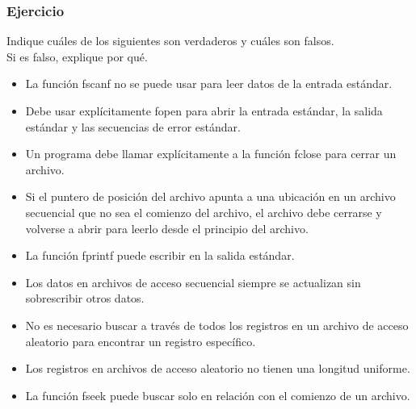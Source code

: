 \subsubsection{Ejercicio}
Indique cuáles de los siguientes son verdaderos y cuáles son falsos.\\
Si es falso, explique por qué.
\begin{itemize}[a)]
  \item La función fscanf no se puede usar para leer datos de la entrada estándar.
  \item Debe usar explícitamente fopen para abrir la entrada estándar, la salida estándar y las secuencias de error estándar.
  \item Un programa debe llamar explícitamente a la función fclose para cerrar un archivo.
  \item Si el puntero de posición del archivo apunta a una ubicación en un archivo secuencial que no sea el comienzo del archivo, el archivo debe cerrarse y volverse a abrir para leerlo desde el principio del archivo.
  \item La función fprintf puede escribir en la salida estándar.
  \item Los datos en archivos de acceso secuencial siempre se actualizan sin sobrescribir otros datos.
  \item No es necesario buscar a través de todos los registros en un archivo de acceso aleatorio para encontrar un registro específico.
  \item Los registros en archivos de acceso aleatorio no tienen una longitud uniforme.
  \item La función fseek puede buscar solo en relación con el comienzo de un archivo.
\end{itemize}



